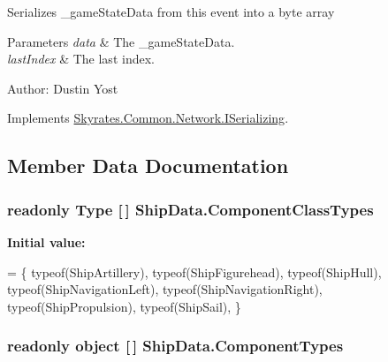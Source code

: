 Serializes \-\_\-game\-State\-Data from this event into a byte array 


\begin{DoxyParams}{Parameters}
{\em data} & The \-\_\-game\-State\-Data.\\
\hline
{\em last\-Index} & The last index.\\
\hline
\end{DoxyParams}


Author\-: Dustin Yost 

Implements \hyperlink{interface_skyrates_1_1_common_1_1_network_1_1_i_serializing_a1433635010dc809984bb621d857f9489}{Skyrates.\-Common.\-Network.\-I\-Serializing}.



\subsection{Member Data Documentation}
\hypertarget{class_ship_data_a725a1caabab53787c0f5ea3e4f71b9cf}{
\subsubsection[{Component\-Class\-Types}]{\setlength{\rightskip}{0pt plus 5cm}readonly Type \mbox{[}$\,$\mbox{]} Ship\-Data.\-Component\-Class\-Types\hspace{0.3cm}{\ttfamily [static]}}}\label{class_ship_data_a725a1caabab53787c0f5ea3e4f71b9cf}
{\bfseries Initial value\-:}
\begin{DoxyCode}
=
    \{
        typeof(ShipArtillery),
        typeof(ShipFigurehead),
        typeof(ShipHull),
        typeof(ShipNavigationLeft),
        typeof(ShipNavigationRight),
        typeof(ShipPropulsion),
        typeof(ShipSail),
    \}
\end{DoxyCode}
\hypertarget{class_ship_data_a47c222837040afdb00f4363070b5d8df}{
\subsubsection[{Component\-Types}]{\setlength{\rightskip}{0pt plus 5cm}readonly object \mbox{[}$\,$\mbox{]} Ship\-Data.\-Component\-Types\hspace{0.3cm}{\ttfamily [static]}}}\label{class_ship_data_a47c222837040afdb00f4363070b5d8df}
